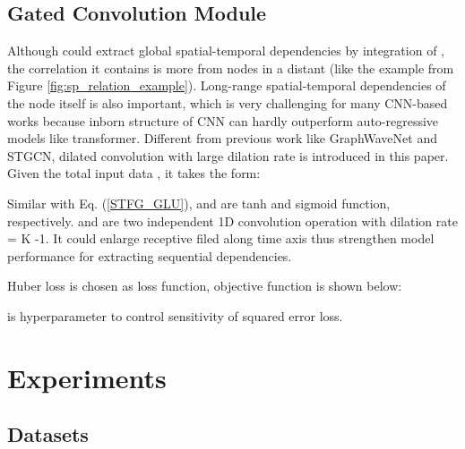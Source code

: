 \documentclass[letterpaper]{article} \usepackage{aaai21}  \usepackage{times}  \usepackage{helvet} \usepackage{courier}  \usepackage[hyphens]{url}  \usepackage{graphicx} \urlstyle{rm} \def\UrlFont{\rm}  \usepackage{natbib}  \usepackage{caption} \frenchspacing  \setlength{\pdfpagewidth}{8.5in}  \setlength{\pdfpageheight}{11in}  \usepackage{multirow}
\begin{document}
\subsection{Gated Convolution Module}
Although  could extract global spatial-temporal dependencies by integration of , the correlation it contains is more from nodes in a distant (like the example from Figure \ref{fig:sp_relation_example}). Long-range spatial-temporal dependencies of the node itself is also important, which is very challenging for many CNN-based works \cite{yu2017spatio,wu2019graph,song2020spatial} because inborn structure of CNN can hardly outperform auto-regressive models like transformer\cite{park2019stgrat,wang2020traffic}. Different from previous work like GraphWaveNet and STGCN, dilated convolution with large dilation rate is introduced in this paper. Given the total input data , it takes the form:


Similar with Eq. (\ref{STFG_GLU}),  and  are tanh and sigmoid function, respectively.  and  are two independent 1D convolution operation with dilation rate = K -1. It could enlarge receptive filed along time axis thus strengthen model performance for extracting sequential dependencies.

Huber loss is chosen as loss function, objective function is shown below:



 is hyperparameter to control sensitivity of squared error loss.

\section{Experiments}
\subsection{Datasets}

\begin{table}[]
	\caption{Dataset description and statistics.}
	\label{tab:data_info}
\end{table}
\end{document}
